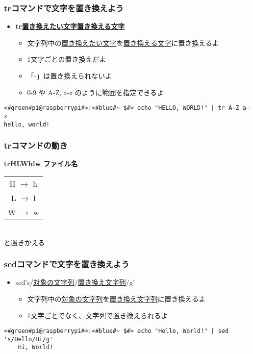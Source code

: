 \begin{frame}[fragile]
    \frametitle{trコマンドで文字を置き換えよう}
    \begin{itemize}
        \item {\bf tr\textvisiblespace\underline{置き換えたい文字}\textvisiblespace\underline{置き換える文字}}
        \begin{itemize}
            \small
            \item 文字列中の\underline{置き換えたい文字}を\underline{置き換える文字}に置き換えるよ
            \item 1文字ごとの置き換えだよ
            \item 「-」は置き換えられないよ
            \item 0-9 や A-Z, a-z のように範囲を指定できるよ
        \end{itemize}
    \end{itemize}
    \begin{lstlisting}[title=範囲指定を使った置き換え, label=tr_range]
<#green#pi@raspberrypi#>:<#blue#~ $#> echo "HELLO, WORLD!" | tr A-Z a-z
hello, world!
    \end{lstlisting}
\end{frame}

\begin{frame}
    \frametitle{trコマンドの動き}
    \begin{center}
        {\bf tr\textvisiblespace HLW\textvisiblespace hlw ファイル名}\\
        \vspace{\zh}
        \begin{tabular}{c}
        H $\rightarrow$ h \\
        L $\rightarrow$ l \\
        W $\rightarrow$ w \\ 
        \end{tabular}\\
        と置きかえる
    \end{center}
\end{frame}

\begin{frame}[fragile]
    \frametitle{sedコマンドで文字を置き換えよう}
    \begin{itemize}
        \item sed\textvisiblespace 's/\underline{対象の文字列}/\underline{置き換え文字列}/g'
        \begin{itemize}
            \small
            \item 文字列中の\underline{対象の文字列}を\underline{置き換え文字列}に置き換えるよ
            \item 1文字ごとでなく、文字列で置き換えられるよ
        \end{itemize}
    \end{itemize}
    \begin{lstlisting}[title=sedでの文字の置き換え, label=sed_app]
    <#green#pi@raspberrypi#>:<#blue#~ $#> echo "Hello, World!" | sed 's/Hello/Hi/g'
    Hi, World!
    \end{lstlisting}
\end{frame}


